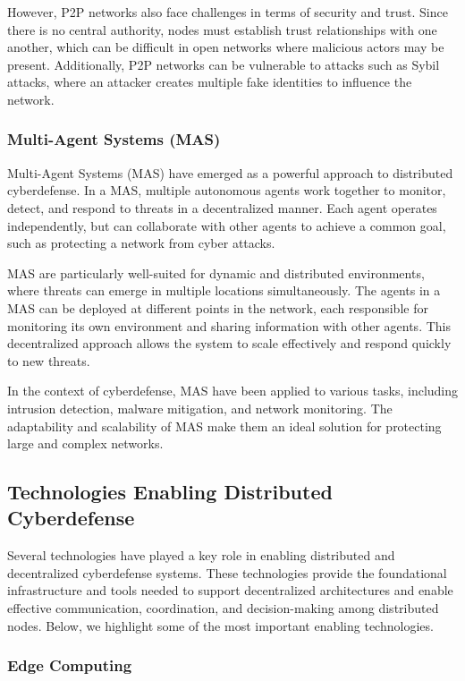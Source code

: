 However, P2P networks also face challenges in terms of security and trust. Since there is no central authority, nodes must establish trust relationships with one another, which can be difficult in open networks where malicious actors may be present. Additionally, P2P networks can be vulnerable to attacks such as Sybil attacks, where an attacker creates multiple fake identities to influence the network.

\subsubsection{Multi-Agent Systems (MAS)}

Multi-Agent Systems (MAS) have emerged as a powerful approach to distributed cyberdefense. In a MAS, multiple autonomous agents work together to monitor, detect, and respond to threats in a decentralized manner. Each agent operates independently, but can collaborate with other agents to achieve a common goal, such as protecting a network from cyber attacks.

MAS are particularly well-suited for dynamic and distributed environments, where threats can emerge in multiple locations simultaneously. The agents in a MAS can be deployed at different points in the network, each responsible for monitoring its own environment and sharing information with other agents. This decentralized approach allows the system to scale effectively and respond quickly to new threats.

In the context of cyberdefense, MAS have been applied to various tasks, including intrusion detection, malware mitigation, and network monitoring. The adaptability and scalability of MAS make them an ideal solution for protecting large and complex networks.

\subsection{Technologies Enabling Distributed Cyberdefense}

Several technologies have played a key role in enabling distributed and decentralized cyberdefense systems. These technologies provide the foundational infrastructure and tools needed to support decentralized architectures and enable effective communication, coordination, and decision-making among distributed nodes. Below, we highlight some of the most important enabling technologies.

\subsubsection{Edge Computing}

